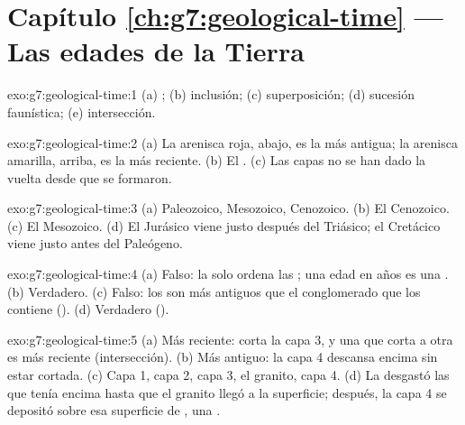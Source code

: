 \section*{Capítulo \ref{ch:g7:geological-time} --- Las edades de la Tierra}

\begin{solution}{exo:g7:geological-time:1}
(a) ; (b) inclusión; (c) superposición; (d) sucesión
faunística; (e) intersección.
\end{solution}

\begin{solution}{exo:g7:geological-time:2}
(a) La arenisca roja, abajo, es la más antigua; la arenisca amarilla,
arriba, es la más reciente. (b) El . (c) Las
capas no se han dado la vuelta desde que se formaron.
\end{solution}

\begin{solution}{exo:g7:geological-time:3}
(a) Paleozoico, Mesozoico, Cenozoico. (b) El Cenozoico. (c) El Mesozoico.
(d) El Jurásico viene justo después del Triásico; el Cretácico viene justo
antes del Paleógeno.
\end{solution}

\begin{solution}{exo:g7:geological-time:4}
(a) Falso: la  solo ordena las ; una edad en años es
una . (b) Verdadero. (c) Falso: los  son más antiguos
que el conglomerado que los contiene ().
(d) Verdadero ().
\end{solution}

\begin{solution}{exo:g7:geological-time:5}
(a) Más reciente: corta la capa 3, y una  que corta a otra es más
reciente (intersección). (b) Más antiguo: la capa 4 descansa encima sin
estar cortada. (c) Capa 1, capa 2, capa 3, el granito, capa 4. (d) La
 desgastó las  que tenía encima hasta que el granito llegó a
la superficie; después, la capa 4 se depositó sobre esa superficie de
, una .
\end{solution}

